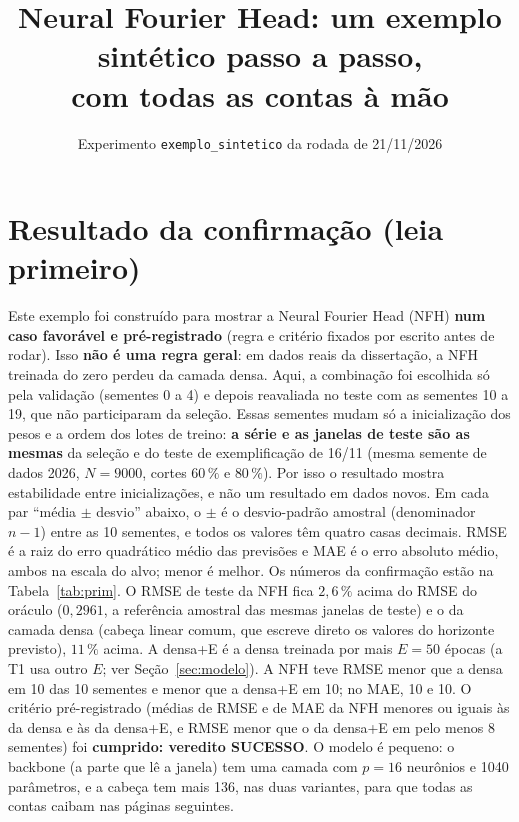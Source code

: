 \documentclass[11pt,a4paper]{article}
\title{Neural Fourier Head: um exemplo sintético passo a passo,\\com todas as contas à mão}
\author{Experimento \texttt{exemplo\_sintetico} da rodada de 21/11/2026}
\date{}
\begin{document}
\maketitle


\section*{Resultado da confirmação (leia primeiro)}

Este exemplo foi construído para mostrar a Neural Fourier Head (NFH) \textbf{num caso favorável e pré-registrado} (regra e critério fixados por escrito antes de rodar). Isso \textbf{não é uma regra geral}: em dados reais da dissertação, a NFH treinada do zero perdeu da camada densa. Aqui, a combinação foi escolhida só pela validação (sementes 0 a 4) e depois reavaliada no teste com as sementes 10 a 19, que não participaram da seleção. Essas sementes mudam só a inicialização dos pesos e a ordem dos lotes de treino: \textbf{a série e as janelas de teste são as mesmas} da seleção e do teste de exemplificação de 16/11 (mesma semente de dados 2026, $N=9000$, cortes $60\,\%$ e $80\,\%$). Por isso o resultado mostra estabilidade entre inicializações, e não um resultado em dados novos. Em cada par ``média $\pm$ desvio'' abaixo, o $\pm$ é o desvio-padrão amostral (denominador $n-1$) entre as 10 sementes, e todos os valores têm quatro casas decimais. RMSE é a raiz do erro quadrático médio das previsões e MAE é o erro absoluto médio, ambos na escala do alvo; menor é melhor. Os números da confirmação estão na Tabela~\ref{tab:prim}. O RMSE de teste da NFH fica $2,6\,\%$ acima do RMSE do oráculo ($0,2961$, a referência amostral das mesmas janelas de teste) e o da camada densa (cabeça linear comum, que escreve direto os valores do horizonte previsto), $11\,\%$ acima. A densa+E é a densa treinada por mais $E=50$ épocas (a T1 usa outro $E$; ver Seção~\ref{sec:modelo}). A NFH teve RMSE menor que a densa em 10 das 10 sementes e menor que a densa+E em 10; no MAE, 10 e 10. O critério pré-registrado (médias de RMSE e de MAE da NFH menores ou iguais às da densa e às da densa+E, e RMSE menor que o da densa+E em pelo menos 8 sementes) foi \textbf{cumprido: veredito SUCESSO}. O modelo é pequeno: o backbone (a parte que lê a janela) tem uma camada com $p=16$ neurônios e 1040 parâmetros, e a cabeça tem mais 136, nas duas variantes, para que todas as contas caibam nas páginas seguintes.
\end{document}
